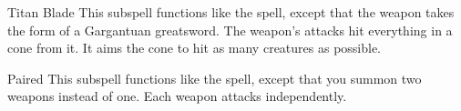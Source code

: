\begin{ability}[\nth{8}]{Titan Blade}
This subspell functions like the  spell, except that the weapon takes the form of a Gargantuan greatsword.
The weapon's attacks hit everything in a \areamed cone from it.
It aims the cone to hit as many creatures as possible.
\end{ability}
\vspace{0.25em}


\begin{ability}[\nth{9}]{Paired}
This subspell functions like the  spell, except that you summon two weapons instead of one.
Each weapon attacks independently.
\end{ability}
\vspace{0.25em}
